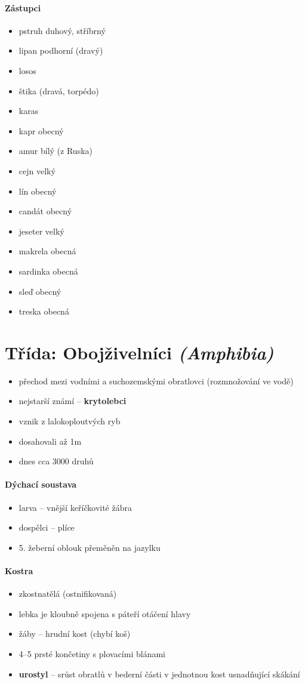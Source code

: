 \paragraph{Zástupci}
\begin{itemize}
\item pstruh duhový, stříbrný
\item lipan podhorní (dravý)
\item losos
\item štika (dravá, torpédo)
\item karas
\item kapr obecný
\item amur bílý (z Ruska)
\item cejn velký
\item lín obecný
\item candát obecný
\item jeseter velký
\item makrela obecná
\item sardinka obecná
\item sleď obecný
\item treska obecná
\end{itemize}

\newpage
\section{Třída: Obojživelníci \textit{(Amphibia)}}
\begin{itemize}
\item přechod mezi vodními a suchozemskými obratlovci (rozmnožování ve vodě)
\item nejstarší známí -- \textbf{krytolebci}
\item vznik z lalokoploutvých ryb
\item dosahovali až 1m
\item dnes cca 3000 druhů
\end{itemize}

\paragraph{Dýchací soustava}
\begin{itemize}
\item larva -- vnější keříčkovité žábra
\item dospělci -- plíce
\item 5. žeberní oblouk přeměněn na jazylku
\end{itemize}

\paragraph{Kostra}
\begin{itemize}
\item zkostnatělá (ostnifikovaná)
\item lebka je kloubně spojena s páteří \ra otáčení hlavy
\item žáby -- hrudní kost (chybí koš)
\item 4--5 prsté končetiny s plovacími blánami
\item \textbf{urostyl} -- srůst obratlů v bederní části v jednotnou kost usnadňující skákání
\end{itemize}

